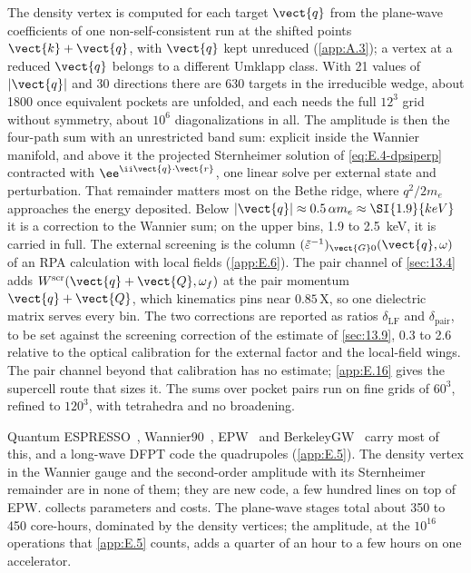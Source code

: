 The density vertex is computed for each target $\vect{q}$ from the plane-wave coefficients of one non-self-consistent run at the shifted points $\vect{k}+\vect{q}$, with $\vect{q}$ kept unreduced (\cref{app:A.3}); a vertex at a reduced $\vect{q}$ belongs to a different Umklapp class. With 21 values of $|\vect{q}|$ and 30 directions there are 630 targets in the irreducible wedge, about 1800 once equivalent pockets are unfolded, and each needs the full $12^3$ grid without symmetry, about $10^6$ diagonalizations in all. The amplitude is then the four-path sum with an unrestricted band sum: explicit inside the Wannier manifold, and above it the projected Sternheimer solution of \cref{eq:E.4-dpsiperp} contracted with $\ee^{\ii\vect{q}\cdot\vect{r}}$, one linear solve per external state and perturbation. That remainder matters most on the Bethe ridge, where $q^2/2m_e$ approaches the energy deposited. Below $|\vect{q}| \approx 0.5\,\alpha m_e \approx \SI{1.9}{keV}$ it is a correction to the Wannier sum; on the upper bins, 1.9 to \SI{2.5}{keV}, it is carried in full. The external screening is the column $(\tilde\varepsilon^{-1})_{\vect{G}0}(\vect{q},\omega)$ of an RPA calculation with local fields (\cref{app:E.6}). The pair channel of \cref{sec:13.4} adds $W^{\mathrm{scr}}(\vect{q}+\vect{Q},\omega_f)$ at the pair momentum $\vect{q}+\vect{Q}$, which kinematics pins near $0.85\,\mathrm{X}$, so one dielectric matrix serves every bin. The two corrections are reported as ratios $\delta_{\mathrm{LF}}$ and $\delta_{\mathrm{pair}}$, to be set against the screening correction of the estimate of \cref{sec:13.9}, 0.3 to 2.6 relative to the optical calibration for the external factor and the local-field wings. The pair channel beyond that calibration has no estimate; \cref{app:E.16} gives the supercell route that sizes it. The sums over pocket pairs run on fine grids of $60^3$, refined to $120^3$, with tetrahedra and no broadening.

Quantum ESPRESSO~\cite{giannozzi2017advanced}, Wannier90~\cite{pizzi2020wannier90}, EPW~\cite{ponce2016epw} and BerkeleyGW~\cite{deslippe2012berkeleygw} carry most of this, and a long-wave DFPT code the quadrupoles (\cref{app:E.5}). The density vertex in the Wannier gauge and the second-order amplitude with its Sternheimer remainder are in none of them; they are new code, a few hundred lines on top of EPW.  collects parameters and costs. The plane-wave stages total about 350 to 450 core-hours, dominated by the density vertices; the amplitude, at the $10^{16}$ operations that \cref{app:E.5} counts, adds a quarter of an hour to a few hours on one accelerator.

